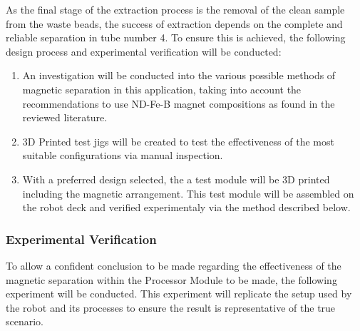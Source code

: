 As the final stage of the extraction process is the removal of the clean sample from the waste beads, the success of extraction depends on the complete and reliable separation in tube number 4. To ensure this is achieved, the following design process and experimental verification will be conducted:
\begin{enumerate}
	\item An investigation will be conducted into the various possible methods of magnetic separation in this application, taking into account the recommendations to use ND-Fe-B magnet compositions as found in the reviewed literature.
	\item 3D Printed test jigs will be created to test the effectiveness of the most suitable configurations via manual inspection.
	\item With a preferred design selected, the a test module will be 3D printed including the magnetic arrangement. This test module will be assembled on the robot deck and verified experimentaly via the method described below.
\end{enumerate}

\subsubsection{Experimental Verification}

To allow a confident conclusion to be made regarding the effectiveness of the magnetic separation within the Processor Module to be made, the following experiment will be conducted. This experiment will replicate the setup used by the robot and its processes to ensure the result is representative of the true scenario.

